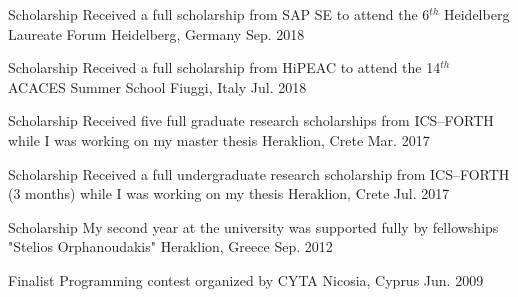 \begin{cvhonors}
  \cvhonor
    {Scholarship} %
    {Received a full scholarship from SAP SE to attend the 6$^{th}$
    Heidelberg Laureate Forum} %
    {Heidelberg, Germany} %
    {Sep. 2018} %

  \cvhonor
    {Scholarship} %
    {Received a full scholarship from HiPEAC to attend the 14$^{th}$
    ACACES Summer School} %
    {Fiuggi, Italy} %
    {Jul. 2018} %

  \cvhonor
    {Scholarship} %
    {Received five full graduate research scholarships from ICS--FORTH
     while I was working on my master thesis} %
    {Heraklion, Crete} %
    {Mar. 2017} %

  \cvhonor
    {Scholarship} %
    {Received a full undergraduate research scholarship from
    ICS--FORTH (3 months) while I was working on my thesis} %
    {Heraklion, Crete} %
    {Jul. 2017} %
  
  \cvhonor
    {Scholarship} %
    {My second year at the university was supported fully by
          fellowships "Stelios Orphanoudakis"} %
    {Heraklion, Greece} %
    {Sep. 2012} %

  \cvhonor
    {Finalist} %
    {Programming contest organized by CYTA} %
    {Nicosia, Cyprus} %
    {Jun. 2009} %

\end{cvhonors}

